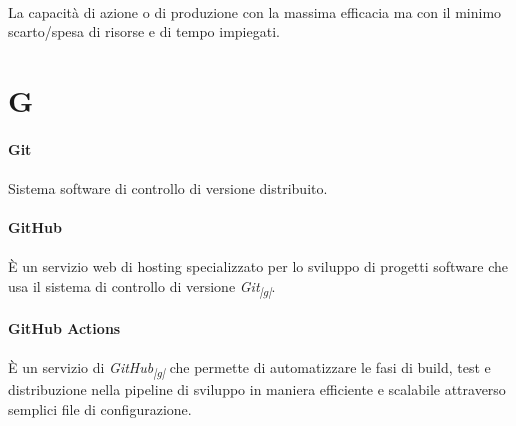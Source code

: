 \documentclass[10pt, a4paper]{article}
\newcommand{\pg}{\textsubscript{|g|}}
\begin{document}
\paragraph{}La capacità di azione o di produzione con la massima efficacia ma con il minimo scarto/spesa di risorse e di tempo impiegati.


\newpage
\section{G}
\vspace{2em}
\paragraph{Git}\noindent\hrulefill
\paragraph{}Sistema software di controllo di versione distribuito.

\vspace{2em}
\paragraph{GitHub}\noindent\hrulefill
\paragraph{}È un servizio web di hosting specializzato per lo sviluppo di progetti software 
che usa il sistema di controllo di versione \textit{Git\pg}.

\vspace{2em}
\paragraph{GitHub Actions}\noindent\hrulefill
\paragraph{}È un servizio di \textit{GitHub\pg} che permette di automatizzare le fasi di build, test e distribuzione nella pipeline di sviluppo in maniera efficiente e scalabile attraverso semplici file di configurazione.
\end{document}
